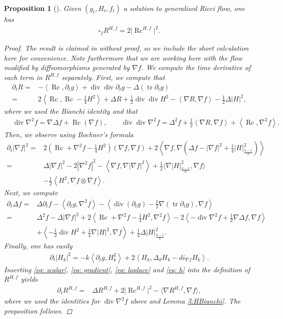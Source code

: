\documentclass[11pt]{article}
\numberwithin{equation}{section}
\numberwithin{equation}{section}
\newtheorem{prop}[thm]{Proposition}
 { \theoremstyle{definition}
\newtheorem{defn}[thm]{Definition}
\newtheorem{Note}[thm]{Note}
\newtheorem{Example}[thm]{Example}
\newtheorem{rmk}[thm]{Remark} }
\newcommand{\del}{\partial}
\newcommand{\N}{\nabla}
\newcommand{\IP}[1]{\left<#1\right>}
\newcommand{\wwnorm}[1]{\left|#1\right|^2_{\frac{k-1}k}}
\DeclareMathOperator{\Rc}{Rc}
\DeclareMathOperator{\tr}{tr}
\DeclareMathOperator{\divg}{div}
\begin{document}
\begin{prop}[{\cite[Proposition 2.11]{Streetsscalar}}]\label{p:scalarmonotonicity} Given $(g_t, H_t, f_t)$ a solution to generalized Ricci flow, one has
\begin{align*}
\square_f R^{H,f} = 2 \big|\Rc^{H,f}\big|^2.
\end{align*}
\begin{proof} The result is claimed in \cite{Streetsscalar} without proof, so we include the short calculation here for convenience. Note furthermore that we are working here with the flow modified by diffeomorphisms generated by $\N f$. We compute the time derivative of each term in $R^{H,f}$ separately.
First, we compute that
	\begin{align}
 	\del_t R={}&-\IP{\Rc,\del_tg}+\divg\divg\del_t g-\Delta(\tr \del_t g)\nonumber\\
 ={}& 2\IP{\Rc,\Rc-\frac14 H^2}+\Delta R+\frac12\divg\divg H^2-\IP{\N R,\N f}-\frac12\Delta|H|^2, \label{eq: scalar}
 \end{align}
 	where we used the Bianchi identity and that
 	\begin{align*}
 	&\divg \N^2f= \N\Delta f+\Rc(\N f),\qquad\divg\divg \N^2f= \Delta^2 f+\frac12\IP{\N R,\N f}+\IP{\Rc,\N^2 f}.
 	\end{align*}
 	Then, we observe using Bochner's formula
 	\begin{align}
 	\del_t|\N f|^2={}& 2\left(\Rc+\N^2 f-\frac14 H^2\right)(\N f,\N f)+2\IP{\N f,\N\left( \Delta f-|\N f|^2 + \frac{1}{4} \wwnorm{H} \right)}\nonumber\\
 ={}& \Delta|\N f|^2-2|\N^2f|^2-\IP{\N f,\N |\N f|^2}+\frac12\big\langle\N\wwnorm{H},\N f\big\rangle\nonumber\\
 &-\frac12\IP{H^2,\N f\otimes \N f}.\label{eq: gradient}
 \end{align}
 Next, we compute 	
 	\begin{align}
 	\del_t \Delta f={}&\Delta \del_t f-\IP{\del_t g,\N^2 f}-\IP{\divg(\del_tg)-\frac12\N(\tr\del_tg),\N f}\nonumber\\
 ={}&\Delta^2 f-\Delta|\N f|^2+2\IP{\Rc+\N^2 f-\frac14 H^2,\N^2 f}-2\IP{-\divg\N^2f+\frac12\N\Delta f,\N f}\nonumber\\
 	& +\IP{-\frac12\divg H^2+\frac14\N |H|^2,\N f}+\frac14\Delta \wwnorm{H}.\label{eq: laplace}
 \end{align}
 	Finally, one has easily
 	\begin{align} \label{eq: h}
 	\del_t |H_k|^2=-k\IP{\del_t g, H_k^2}+2\IP{H_k,\Delta_d H_k-di_{\N f} H_k}.
 	\end{align}
 	Inserting \eqref{eq: scalar}, \eqref{eq: gradient}, \eqref{eq: laplace} and \eqref{eq: h} into the definition of $R^{H,f}$ yields
 \begin{align*}
 	\del_tR^{H,f}
 	={}&\Delta R^{H,f}+2\big|\Rc^{H,f}\big|^2-\big\langle\N R^{H,f},\N f\big\rangle,
 	\end{align*}
 where we used the identities for $\divg \N^2 f$ above and Lemma \ref{l:HBianchi}. The proposition follows.
\end{proof}
\end{prop}
\end{document}
